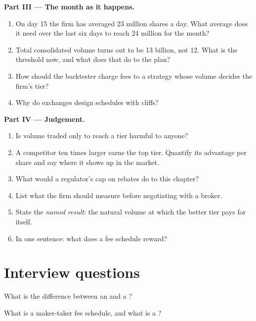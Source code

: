 \begin{problem}
\medskip\noindent\textbf{Part III --- The month as it happens.}
\begin{enumerate}[resume]
\item On day 15 the firm has averaged 23 million shares a day. What average
does it need over the last six days to reach 24 million for the month?
\item Total consolidated volume turns out to be 13 billion, not 12. What is
the threshold now, and what does that do to the plan?
\item How should the backtester charge fees to a strategy whose volume
decides the firm's tier?
\item Why do exchanges design schedules with cliffs?
\end{enumerate}

\medskip\noindent\textbf{Part IV --- Judgement.}
\begin{enumerate}[resume]
\item Is volume traded only to reach a tier harmful to anyone?
\item A competitor ten times larger earns the top tier. Quantify its
advantage per share and say where it shows up in the market.
\item What would a regulator's cap on rebates do to this chapter?
\item List what the firm should measure before negotiating with a broker.
\item State the \emph{named result}: the natural volume at which the better
tier pays for itself.
\item In one sentence: what does a fee schedule reward?
\end{enumerate}
\end{problem}

\section{Interview questions}

\begin{interviewq}\label{iq:m1:getting-access-equities:1}
What is the difference between an  and a ?
\end{interviewq}

\begin{interviewq}\label{iq:m1:getting-access-equities:2}
What is a maker-taker fee schedule, and what is a ?
\end{interviewq}

